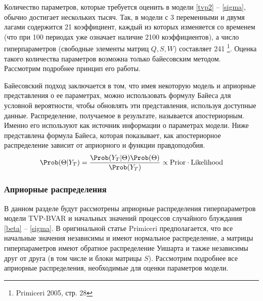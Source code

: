 Количество параметров, которые требуется оценить в модели \eqref{tvp2} -- \eqref{sigma}, обычно достигает нескольких тысяч. Так, в модели с 3 переменными и двумя лагами содержится 21 коэффициент, каждый из которых изменяется со временем (что при 100 периодах уже означает наличие 2100 коэффициентов), а число гиперпараметров (свободные элементы матриц $Q, S, W$) составляет 241 \footnote{Primiceri 2005, стр. 28}. Оценка такого количества параметров возможна только байесовским методом. Рассмотрим подробнее принцип его работы.

Байесовский подход заключается в том, что имея некоторую модель и априорные представления о ее параметрах, можно использовать формулу Байеса для условной вероятности, чтобы обновлять эти представления, используя доступные данные. Распределение, получаемое в результате, называется апостериорным. Именно его используют как источник информации о параметрах модели. Ниже представлена формула Байеса, которая показывает, как апостериорное распределение зависит от априорного и функции правдоподобия.
\begin{equation}\label{bayes1}
\Prob ( \Theta | Y_T) = \frac{\Prob (Y_T|\Theta) \Prob (\Theta)}{\Prob (Y_T)} \propto \text{Prior} \cdot \text{Likelihood}
\end{equation}

\subsubsection{Априорные распределения}
В данном разделе будут рассмотрены априорные распределения гиперпараметров модели TVP-BVAR и начальных значений процессов случайного блуждания \eqref{beta} -- \eqref{sigma}. В оригинальной статье Primiceri предполагается, что все начальные значения независимы и имеют нормальное распределение, а матрицы гиперпараметров имеют обратное распределение Уишарта и также независимы друг от друга (в том числе и блоки матрицы $S$).  Рассмотрим подробнее все априорные распределения, необходимые для оценки параметров модели.

